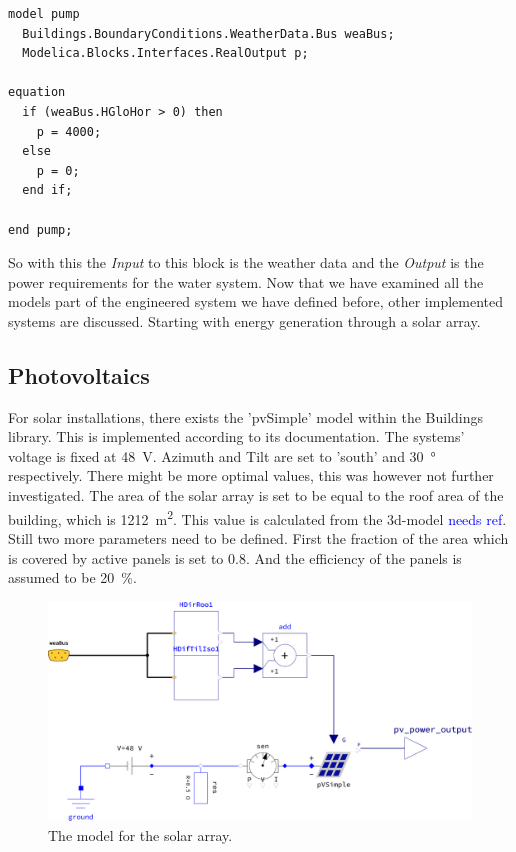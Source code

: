 \begin{lstlisting}[basicstyle=\fontsize{9pt}{10.5pt}\ttfamily, caption={Model implementing the power requirements of the pump.}, label=lst:pump]
model pump
  Buildings.BoundaryConditions.WeatherData.Bus weaBus;
  Modelica.Blocks.Interfaces.RealOutput p;

equation
  if (weaBus.HGloHor > 0) then
    p = 4000;
  else
    p = 0;
  end if;

end pump;
\end{lstlisting}

So with this the \textit{Input} to this block is the weather data and the \textit{Output} is the power requirements for the water system.
Now that we have examined all the models part of the engineered system we have defined before, other implemented systems are discussed.
Starting with energy generation through a solar array.

\subsection{Photovoltaics}
For solar installations, there exists the 'pvSimple' model within the Buildings library.
This is implemented according to its documentation.
The systems' voltage is fixed at \SI{48}{\V}.
Azimuth and Tilt are set to 'south' and \SI{30}{\degree} respectively.
There might be more optimal values, this was however not further investigated.
The area of the solar array is set to be equal to the roof area of the building, which is \SI{1212}{\square\m}.
This value is calculated from the 3d-model \textcolor{Blue}{needs ref}.
Still two more parameters need to be defined.
First the fraction of the area which is covered by active panels is set to 0.8.
And the efficiency of the panels is assumed to be \SI{20}{\percent}.

\begin{figure}[htbp]
  \centering
  \includegraphics[width=\textwidth]{img/simulation/photovoltaik.pdf}
  \caption{The model for the solar array.}
  \label{fig:solar}
\end{figure}

